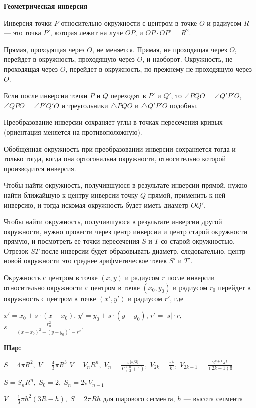 \textbf{Геометрическая инверсия}

Инверсия точки $P$ относительно окружности с центром в точке $O$ и радиусом $R$ --- это точка $P'$, которая лежит на луче $OP$, и $OP \cdot OP' = R^2$.

Прямая, проходящая через $O$, не меняется. Прямая, не проходящая через $O$, перейдет в окружность, проходящую через $O$, и наоборот. Окружность, не проходящая через $O$, перейдет в окружность, по-прежнему не проходящую через $O$.

Если после инверсии точки $P$ и $Q$ переходят в $P'$ и $Q'$, то $\angle PQO = \angle Q'P'O$, $\angle QPO = \angle P'Q'O$ и треугольники $\triangle PQO$ и $\triangle Q'P'O$ подобны.

Преобразование инверсии сохраняет углы в точках пересечения кривых (ориентация меняется на противоположную).

Обобщённая окружность при преобразовании инверсии сохраняется тогда и только тогда, когда она ортогональна окружности, относительно которой производится инверсия.

Чтобы найти окружность, получившуюся в результате инверсии прямой, нужно найти ближайшую к центру инверсии точку $Q$ прямой, применить к ней инверсию, и тогда искомая окружность будет иметь диаметр $OQ'$.

Чтобы найти окружность, получившуюся в результате инверсии другой окружности, нужно провести через центр инверсии и центр старой окружности прямую, и посмотреть ее точки пересечения $S$ и $T$ со старой окружностью. Отрезок $ST$ после инверсии будет образовывать диаметр, следовательно, центр новой окружности это среднее арифметическое точек $S'$ и $T'$.

Окружность с центром в точке $(x, y)$ и радиусом $r$ после инверсии относительно окружности с центром в точке $(x_0, y_0)$ и радиусом $r_0$ перейдет в окружность с центром в точке $(x', y')$ и радиусом $r'$, где

$x' = x_0 + s \cdot (x - x_0)$,
$y' = y_0 + s \cdot (y - y_0)$,
$r' = |s| \cdot r$,
$s = \frac { r_0^2 } { (x - x_0)^2 + (y - y_0)^2 - r^2 }$.

\textbf{Шар:}

$S=4\pi R^{2},\; V=\frac{4}{3}\pi R^{3}$
$V=V_{n}R^{n},\; V_{n}=\frac{\pi ^{\lfloor n/2 \rfloor}}{\Gamma (\frac{n}{2} + 1)},\; V_{2k}=\frac{\pi^{k}}{k!},\; V_{2k+1}=\frac{2^{k+1}\pi^{k}}{(2k+1)!!}$

$S=S_{n}R^{n},\; S_{0}=2,\; S_{n}=2\pi V_{n - 1}$

$V=\frac{1}{3}\pi h^{2}(3R-h),\; S=2\pi Rh$ для шарового сегмента, $h$ --- высота сегмента

